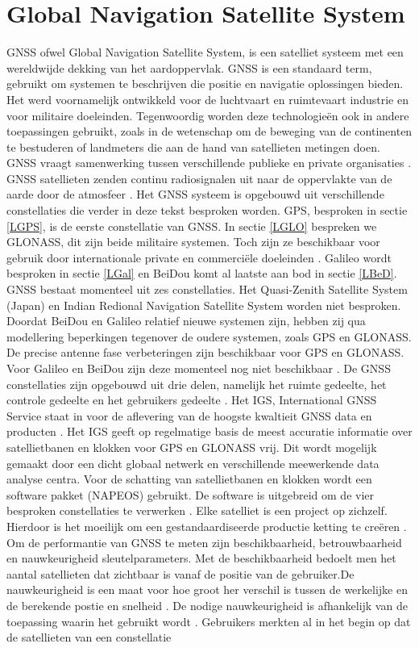 \section{Global Navigation Satellite System}
\label{LGNS}
GNSS ofwel Global Navigation Satellite System, is een satelliet systeem met een wereldwijde dekking van het aardoppervlak. GNSS is een standaard term, gebruikt om systemen te beschrijven die positie en navigatie oplossingen bieden. Het werd voornamelijk ontwikkeld voor de luchtvaart en ruimtevaart industrie en voor militaire doeleinden. Tegenwoordig worden deze technologie\"en ook in andere toepassingen gebruikt, zoals in de wetenschap om de beweging van de continenten te bestuderen of landmeters die aan de hand van satellieten metingen doen. GNSS vraagt samenwerking tussen verschillende publieke en private organisaties \cite{LBibGNSS3}. GNSS satellieten zenden continu radiosignalen uit naar de oppervlakte van de aarde door de atmosfeer \cite{LBibGPS4}. Het GNSS systeem is opgebouwd uit verschillende constellaties die verder in deze tekst besproken worden. GPS, besproken in sectie \ref{LGPS}, is de eerste constellatie van GNSS. In sectie \ref{LGLO} bespreken we GLONASS, dit zijn beide militaire systemen. Toch zijn ze beschikbaar voor gebruik door internationale private en commerci\"ele doeleinden \cite{LBibGNSS8}. Galileo wordt besproken in sectie \ref{LGal} en BeiDou komt al laatste aan bod in sectie \ref{LBeD}. GNSS bestaat momenteel uit zes constellaties. Het Quasi-Zenith Satellite System (Japan) en Indian Redional Navigation Satellite System worden niet besproken. Doordat BeiDou en Galileo relatief nieuwe systemen zijn, hebben zij qua modellering beperkingen tegenover de oudere systemen, zoals GPS en GLONASS. De precise antenne fase verbeteringen zijn beschikbaar voor GPS en GLONASS. Voor Galileo en BeiDou zijn deze momenteel nog niet beschikbaar \cite{LBibPPP2}. De GNSS constellaties zijn opgebouwd uit drie delen, namelijk het ruimte gedeelte, het controle gedeelte en het gebruikers gedeelte \cite{LBibBeiDou2}.  Het IGS, International GNSS Service staat in voor de aflevering van de hoogste kwaltieit GNSS data en producten \cite{LBibGNSS}. Het IGS geeft op regelmatige basis de meest accuratie informatie over satellietbanen en klokken voor GPS en GLONASS vrij. Dit wordt mogelijk gemaakt door een dicht globaal netwerk en verschillende meewerkende data analyse centra. Voor de schatting van satellietbanen en klokken wordt een software pakket (NAPEOS) gebruikt. De software is uitgebreid om de vier besproken constellaties te verwerken \cite{LBibPPP2}. Elke satelliet is een project op zichzelf. Hierdoor is het moeilijk om een gestandaardiseerde productie ketting te cre\"eren \cite{LBibGNSS3}. Om de performantie van GNSS te meten zijn beschikbaarheid, betrouwbaarheid en nauwkeurigheid sleutelparameters. Met de beschikbaarheid bedoelt men het aantal satellieten dat zichtbaar is vanaf de positie van de gebruiker.De nauwkeurigheid is een maat voor hoe groot her verschil is tussen de werkelijke en de berekende postie en snelheid \cite{LBibGNSS6}. De nodige nauwkeurigheid is afhankelijk van de toepassing waarin het gebruikt wordt \cite{LBibRTK3}. Gebruikers merkten al in het begin op dat de satellieten van een constellatie 